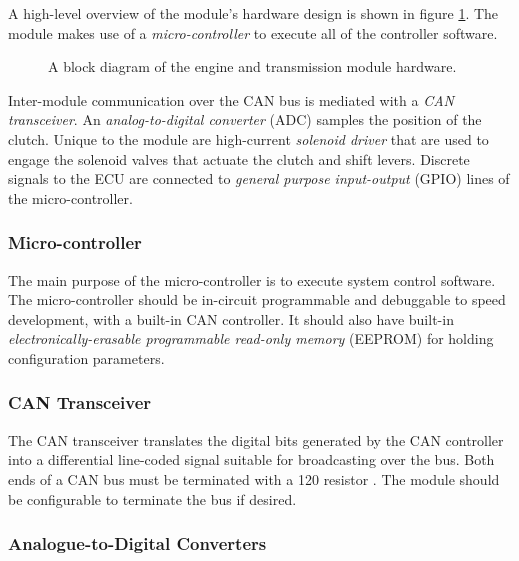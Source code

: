 A high-level overview of the module's hardware design is shown in figure \ref{fig:engine_hardware_design_block}. The module makes use of a \emph{micro-controller} to execute all of the controller software. 

\vspace{1em}
\begin{figure}[H]
	\centering
	
	\caption{A block diagram of the engine and transmission module hardware.}
	\label{fig:engine_hardware_design_block}
\end{figure}


Inter-module communication over the CAN bus is mediated with a \emph{CAN transceiver}. An \emph{analog-to-digital converter} (ADC) samples the position of the clutch. Unique to the module are high-current \emph{solenoid driver} that are used to engage the solenoid valves that actuate the clutch and shift levers. Discrete signals to the ECU are connected to \emph{general purpose input-output} (GPIO) lines of the micro-controller.

\subsubsection{Micro-controller}


The main purpose of the micro-controller is to execute system control software. The micro-controller should be in-circuit programmable and debuggable to speed development, with a built-in CAN controller. It should also have built-in \emph{electronically-erasable programmable read-only memory} (EEPROM) for holding configuration parameters.

\subsubsection{CAN Transceiver}

The CAN transceiver translates the digital bits generated by the CAN controller into a differential line-coded signal suitable for broadcasting over the bus. Both ends of a CAN bus must be terminated with a \unit{120}{\ohm} resistor \cite{MCP2551}. The module should be configurable to terminate the bus if desired.

\subsubsection{Analogue-to-Digital Converters}

